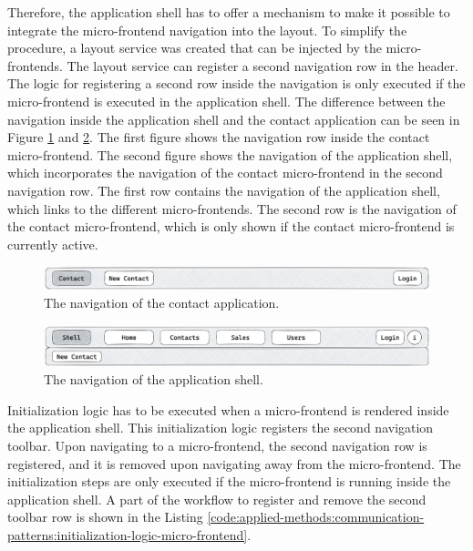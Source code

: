 \noindent Therefore, the application shell has to offer a mechanism to make it possible to integrate the micro-frontend navigation into the layout. To simplify the procedure, a layout service was created that can be injected by the micro-frontends. The layout service can register a second navigation row in the header. The logic for registering a second row inside the navigation is only executed if the micro-frontend is executed in the application shell. The difference between the navigation inside the application shell and the contact application can be seen in Figure \ref{fig:applied-methods:communication-patterns:contact-application-header} and \ref{fig:applied-methods:communication-patterns:application-shell-header}. The first figure shows the navigation row inside the contact micro-frontend. The second figure shows the navigation of the application shell, which incorporates the navigation of the contact micro-frontend in the second navigation row. The first row contains the navigation of the application shell, which links to the different micro-frontends. The second row is the navigation of the contact micro-frontend, which is only shown if the contact micro-frontend is currently active.

\ifshowImages
  \begin{figure}[H]
  \centering
  \includegraphics[width=0.8\linewidth]{images/applied-methods/communication-patterns/contact-header.png}
  \caption{The navigation of the contact application.}\label{fig:applied-methods:communication-patterns:contact-application-header}
  \end{figure}
\fi

\ifshowImages
  \begin{figure}[H]
  \centering
  \includegraphics[width=0.8\linewidth]{images/applied-methods/communication-patterns/host-contact-header.png}
  \caption{The navigation of the application shell.}\label{fig:applied-methods:communication-patterns:application-shell-header}
  \end{figure}
\fi

\noindent Initialization logic has to be executed when a micro-frontend is rendered inside the application shell. This initialization logic registers the second navigation toolbar. Upon navigating to a micro-frontend, the second navigation row is registered, and it is removed upon navigating away from the micro-frontend. The initialization steps are only executed if the micro-frontend is running inside the application shell. A part of the workflow to register and remove the second toolbar row is shown in the Listing \ref{code:applied-methods:communication-patterns:initialization-logic-micro-frontend}.

